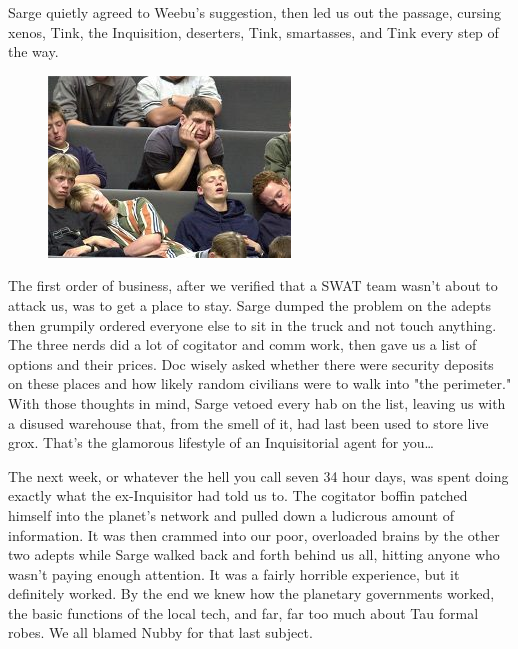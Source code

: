 Sarge quietly agreed to Weebu's suggestion, then led us out the passage, cursing xenos, Tink, the Inquisition, deserters, Tink, smartasses, and Tink every step of the way.

\begin{figure}
	\begin{center}
		\includegraphics[width=\figwidth]{pics/10/19.png}
	\end{center}
\end{figure}
The first order of business, after we verified that a SWAT team wasn't about to attack us, was to get a place to stay. 
Sarge dumped the problem on the adepts then grumpily ordered everyone else to sit in the truck and not touch anything. 
The three nerds did a lot of cogitator and comm work, then gave us a list of options and their prices. 
Doc wisely asked whether there were security deposits on these places and how likely random civilians were to walk into "the perimeter." With those thoughts in mind, Sarge vetoed every hab on the list, leaving us with a disused warehouse that, from the smell of it, had last been used to store live grox. 
That's the glamorous lifestyle of an Inquisitorial agent for you…

The next week, or whatever the hell you call seven 34 hour days, was spent doing exactly what the ex-Inquisitor had told us to. 
The cogitator boffin patched himself into the planet's network and pulled down a ludicrous amount of information. 
It was then crammed into our poor, overloaded brains by the other two adepts while Sarge walked back and forth behind us all, hitting anyone who wasn't paying enough attention. 
It was a fairly horrible experience, but it definitely worked. 
By the end we knew how the planetary governments worked, the basic functions of the local tech, and far, far too much about Tau formal robes. 
We all blamed Nubby for that last subject.


